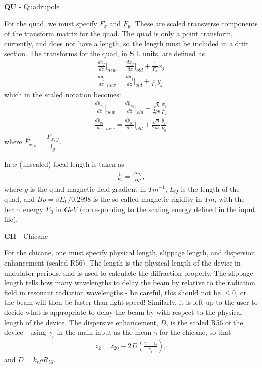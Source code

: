 \documentclass[12pt]{article}%
\begin{document}
{\bf QU} - Quadrupole


For the quad, we must specify $\bar{F}_x$ and $\bar{F}_y$. These are scaled transverse components of the transform matrix for the quad. The quad is only a point transform, currently, and does not have a length, so the length must be included in a drift section. The transforms for the quad, in S.I. units, are defined as
\begin{align}
\frac{d x_j}{d z}  \bigg|_{new} = \frac{d x_j}{d z} \bigg|_{old} + \frac{1}{F_x} x_j \\
\frac{d y_j}{d z}  \bigg|_{new} = \frac{d y_j}{d z} \bigg|_{old} + \frac{1}{F_y} y_j
\end{align}
which in the scaled notation becomes:
\begin{align}
\frac{d \bar{p}_{xj}}{d \bar{z}} \bigg|_{new} = \frac{d \bar{p}_{xj}}{d \bar{z}}  \bigg|_{old} +\frac{\sqrt{\eta}}{2\rho\kappa} \frac{\bar{x}_j}{\bar{F}_x} \\
\frac{d \bar{p}_{yj}}{d \bar{z}}  \bigg|_{new} = \frac{d \bar{p}_{yj}}{d \bar{z}}  \bigg|_{old} +\frac{\sqrt{\eta}}{2\rho\kappa} \frac{\bar{y}_j}{\bar{F}_y}
\end{align}
where $\bar{F}_{x,y} = \dfrac{F_{x,y}}{l_g}$.

In $x$ (unscaled) focal length is taken as
\begin{align}
\frac{1}{F_x} = \frac{g L_Q}{B\rho},
\end{align}
where $g$ is the quad magnetic field gradient in $Tm^{-1}$, $L_Q$ is the length of the quad, and $B\rho = \beta E_0 / 0.2998$ is the so-called magnetic rigidity in $Tm$, with the beam energy $E_0$ in $GeV$ (corresponding to the scaling energy defined in the input file).

{\bf CH} - Chicane

For the chicane, one must specify physical length, slippage length, and dispersion enhancement (scaled R56). The length is the physical length of the device in undulator periods, and is used to calculate the diffraction properly. The slippage length tells how many wavelengths to delay the beam by relative to the radiation field in resonant radiation wavelengths - be careful, this should not be $\leq 0$, or the beam will then be faster than light speed! Similarly, it is left up to the user to decide what is appropriate to delay the beam by with respect to the physical length of the device. The dispersive enhancement, $D$, is the scaled R56 of the device - using $\gamma_r$ in the main input as the mean $\gamma$ for the chicane, so that
\begin{align}
\bar{z}_{2} = \bar{z}_{20} - 2D \left( \frac{\gamma - \gamma_r}{\gamma_r}  \right),
\end{align}
and $D = k_r \rho  R_{56}$.
\end{document}
